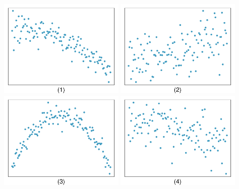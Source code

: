 
\noindent \begin{minipage}[c]{0.43\textwidth}
\end{minipage}
\begin{minipage}[c]{0.57\textwidth}
\begin{center}
\includegraphics[width=0.45\textwidth]{07/figures/eoce/corrMatch/corrMatch5.pdf}
\includegraphics[width= 0.45\textwidth]{07/figures/eoce/corrMatch/corrMatch6.pdf} \\
\includegraphics[width= 0.45\textwidth]{07/figures/eoce/corrMatch/corrMatch7.pdf}
\includegraphics[width= 0.45\textwidth]{07/figures/eoce/corrMatch/corrMatch8.pdf}
\end{center}
\end{minipage}


